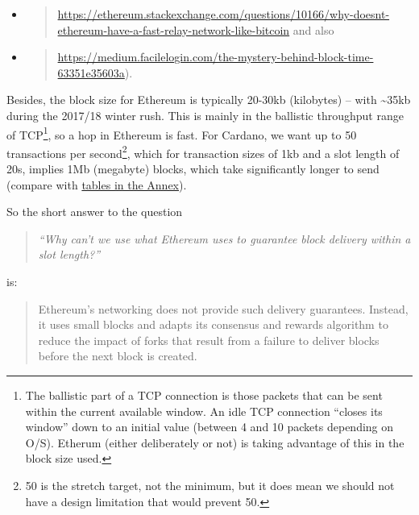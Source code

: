 \documentclass[11pt,a4paper]{article}
\begin{document}
\begin{itemize}
\item
  \begin{quote}
  \href{https://ethereum.stackexchange.com/questions/10166/why-doesnt-ethereum-have-a-fast-relay-network-like-bitcoin}{{https://ethereum.stackexchange.com/questions/10166/why-doesnt-ethereum-have-a-fast-relay-network-like-bitcoin}}
  and also
  \end{quote}
\item
  \begin{quote}
  \href{https://medium.facilelogin.com/the-mystery-behind-block-time-63351e35603a}{{https://medium.facilelogin.com/the-mystery-behind-block-time-63351e35603a}}).
  \end{quote}
\end{itemize}

Besides, the block size for Ethereum is typically 20-30kb (kilobytes) --
with \textasciitilde{}35kb during the 2017/18 winter rush. This is
mainly in the ballistic throughput range of TCP\footnote{The ballistic
  part of a TCP connection is those packets that can be sent within the
  current available window. An idle TCP connection ``closes its window''
  down to an initial value (between 4 and 10 packets depending on O/S).
  Etherum (either deliberately or not) is taking advantage of this in
  the block size used.}, so a hop in Ethereum is fast. For Cardano, we
want up to 50 transactions per second\footnote{50 is the stretch target,
  not the minimum, but it does mean we should not have a design
  limitation that would prevent 50.}, which for transaction sizes of 1kb
and a slot length of 20s, implies 1Mb (megabyte) blocks, which take
significantly longer to send (compare with
\protect\hyperlink{tcp-rpc-response-behavior}{{tables in the Annex}}).

So the short answer to the question

\begin{quote}
\emph{``Why can't we use what Ethereum uses to guarantee block delivery
within a slot length?'' }
\end{quote}

is:

\begin{quote}
Ethereum's networking does not provide such delivery guarantees.
Instead, it uses small blocks and adapts its consensus and rewards
algorithm to reduce the impact of forks that result from a failure to
deliver blocks before the next block is created.
\end{quote}
\end{document}
